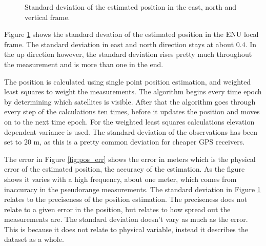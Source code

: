 \documentclass{article}
\begin{document}
\begin{figure}[!ht]
    \centering
    \caption{Standard deviation of the estimated position in the east, north and vertical frame.}
    \label{fig:pos_std}
\end{figure}

Figure \ref{fig:pos_std} shows the standard devation of the estimated position in the ENU local frame. The standard deviation in east and north direction stays at about $0.4$. In the up direction however, the standard deviation rises pretty much throughout the measurement and is more than one in the end.

The position is calculated using single point position estimation, and weighted least squares to weight the measurements. The algorithm begins every time epoch by determining which satellites is visible. After that the algorithm goes through every step of the calculations ten times, before it updates the position and moves on to the next time epoch. For the weighted least squares calculations elevation dependent variance is used. The standard deviation of the observations has been set to $20$ m, as this is a pretty common deviation for cheaper GPS receivers.

The error in Figure \ref{fig:pos_err} shows the error in meters which is the physical error of the estimated position, the accuracy of the estimation. As the figure shows it varies with a high frequency, about one meter, which comes from inaccuracy in the pseudorange measurements. The standard deviation in Figure \ref{fig:pos_std} relates to the preciseness of the position estimation. The preciseness does not relate to a given error in the position, but relates to how spread out the measurements are. The standard deviation doesn't vary as much as the error. This is because it does not relate to physical variable, instead it describes the dataset as a whole.
\end{document}
